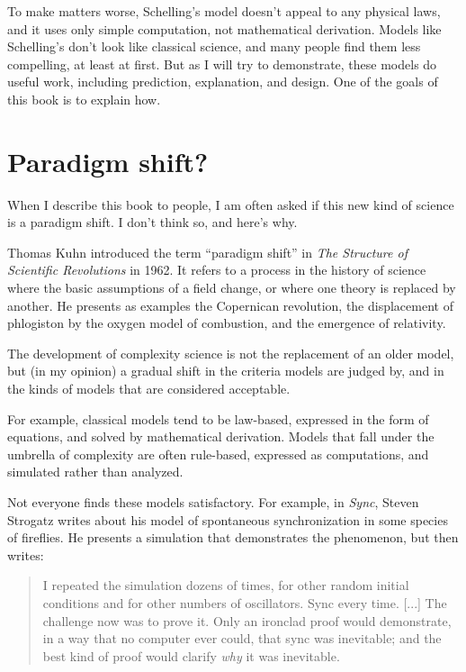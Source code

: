 \documentclass[10pt]{book}
\begin{document}
To make matters worse, Schelling's model doesn't appeal to any
physical laws, and it uses only simple computation, not mathematical
derivation.  Models like Schelling's don't look like classical
science, and many people find them less compelling, at least at first.
But as I will try to demonstrate, these models do useful work,
including prediction, explanation, and design.  One of the goals of
this book is to explain how.


\section{Paradigm shift?}

When I describe this book to people, I am often asked if this new kind
of science is a paradigm shift.  I don't think so, and here's why.

Thomas Kuhn introduced the term ``paradigm shift'' in {\em The
Structure of Scientific Revolutions} in 1962.  It refers to a process
in the history of science where the basic assumptions of a field
change, or where one theory is replaced by another.
He presents as examples the Copernican revolution, the displacement
of phlogiston by the oxygen model of combustion, and the emergence
of relativity.

The development of complexity science is not the replacement of
an older model, but (in my opinion) a gradual shift in the criteria
models are judged by, and in the kinds of models that are considered
acceptable.

For example, classical models tend to be law-based, expressed in the
form of equations, and solved by mathematical derivation.  Models that
fall under the umbrella of complexity are often rule-based,
expressed as computations, and simulated rather than analyzed.

Not everyone finds these models satisfactory.  For example, in
{\em Sync}, Steven Strogatz writes about his model of spontaneous
synchronization in some species of fireflies.  He presents a
simulation that demonstrates the phenomenon, but then writes:

\begin{quote}
I repeated the simulation dozens of times, for other random
initial conditions and for other numbers of oscillators.  Sync
every time. [...] The challenge now was to prove it.  Only an
ironclad proof would demonstrate, in a way that no computer ever
could, that sync was inevitable; and the best kind of proof would
clarify {\em why} it was inevitable.
\end{quote}
\end{document}
